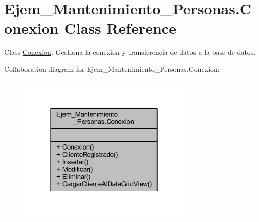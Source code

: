 \hypertarget{class_ejem___mantenimiento___personas_1_1_conexion}{}\section{Ejem\+\_\+\+Mantenimiento\+\_\+\+Personas.\+Conexion Class Reference}
\label{class_ejem___mantenimiento___personas_1_1_conexion}


Class \mbox{\hyperlink{class_ejem___mantenimiento___personas_1_1_conexion}{Conexion}}. Gestiona la conexion y transferencia de datos a la base de datos.  




Collaboration diagram for Ejem\+\_\+\+Mantenimiento\+\_\+\+Personas.\+Conexion\+:
\nopagebreak
\begin{figure}[H]
\begin{center}
\leavevmode
\includegraphics[width=238pt]{class_ejem___mantenimiento___personas_1_1_conexion__coll__graph}
\end{center}
\end{figure}
